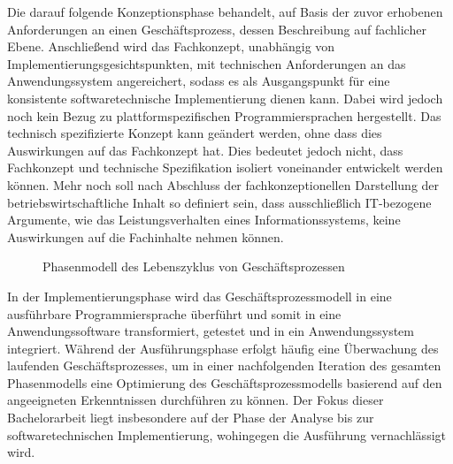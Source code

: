 Die darauf folgende Konzeptionsphase behandelt, auf Basis der zuvor erhobenen Anforderungen an einen Geschäftsprozess, dessen Beschreibung auf fachlicher Ebene. 
\cite{Schwegmann.2002}
Anschließend wird das Fachkonzept, unabhängig von Implementierungsgesichtspunkten, mit technischen Anforderungen an das Anwendungssystem angereichert, sodass es als Ausgangspunkt für eine konsistente softwaretechnische Implementierung dienen kann.
\cite{Scheer.1991}
Dabei wird jedoch noch kein Bezug zu plattformspezifischen Programmiersprachen hergestellt. 
Das technisch spezifizierte Konzept kann geändert werden, ohne dass dies Auswirkungen auf das Fachkonzept hat.
\cite{Speck.2002}
Dies bedeutet jedoch nicht, dass Fachkonzept und technische Spezifikation isoliert voneinander entwickelt werden können. 
Mehr noch soll nach Abschluss der fachkonzeptionellen Darstellung der betriebswirtschaftliche Inhalt so definiert sein, dass ausschließlich \ac{IT}-bezogene Argumente, wie das Leistungsverhalten eines Informationssystems, keine Auswirkungen auf die Fachinhalte nehmen können.  

\begin{figure}[H]
	\centering 
    \caption[Phasenmodell bei der Automatisierung von Geschäftsprozessen]
    {Phasenmodell des Lebenszyklus von Geschäftsprozessen \protect\footnotemark}
    \label{fig:Phasenmodell bei der Automatisierung von Geschäftsprozessen}
\end{figure}

In der Implementierungsphase wird das Geschäftsprozessmodell in eine ausführbare Programmiersprache überführt und somit in eine Anwendungssoftware transformiert, getestet und in ein Anwendungssystem integriert.
\cite{Scheer.1991}
Während der Ausführungsphase erfolgt häufig eine Überwachung des laufenden Geschäftsprozesses, um in einer nachfolgenden Iteration des gesamten Phasenmodells eine Optimierung des Geschäftsprozessmodells basierend auf den angeeigneten Erkenntnissen durchführen zu können.
\cite{Scheer.2005}
Der Fokus dieser Bachelorarbeit liegt insbesondere auf der Phase der Analyse bis zur softwaretechnischen Implementierung, wohingegen die Ausführung vernachlässigt wird.

